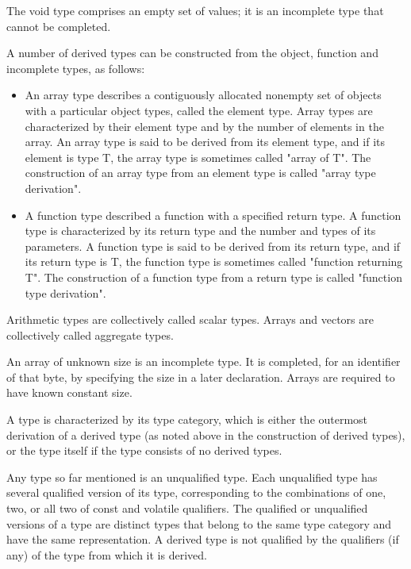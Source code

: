 \documentclass{article}
\begin{document}
The void type comprises an empty set of values; it is an incomplete type that cannot be
completed.
\linebreak

A number of derived types can be constructed from the object, function and incomplete 
types, as follows:
\linebreak

\begin{itemize}
	\item An array type describes a contiguously allocated nonempty set of objects with a 
	      particular object types, called the element type. Array types are characterized 
	      by their element type and by the number of elements in the array.  An array type
	      is said to be derived	from its element type, and if its element is type T, the 
	      array type is sometimes called "array of T".  The construction of an array type
		  from an element type is called "array type derivation".
	\item A function type described a function with a specified return type. A function
		  type is characterized by its return type and the number and types of its
		  parameters. A function type is said to be derived from its return type, and if 
		  its return type is T, the function type is sometimes called "function returning
		   T". The construction of a function type from a return type is called "function
		   type derivation".
\end{itemize}

Arithmetic types are collectively called scalar types. Arrays and vectors are 
collectively called aggregate types.
\linebreak

An array of unknown size is an incomplete type.  It is completed, for an identifier of 
that byte, by specifying the size in a later declaration.  Arrays are required to have 
known constant size.
\linebreak

A type is characterized by its type category, which is either the outermost derivation 
of a derived type (as noted above in the construction of derived types), or the type 
itself if the type consists of no derived types.
\linebreak

Any type so far mentioned is an unqualified type.  Each unqualified type has several 
qualified version of its type, corresponding to the combinations of one, two, or all 
two of const and volatile qualifiers.  The qualified or unqualified versions of a type 
are distinct types that belong to the same type category and have the same representation.
A derived type is not qualified by the qualifiers (if any) of the type from which it 
is derived.
\linebreak
\end{document}
